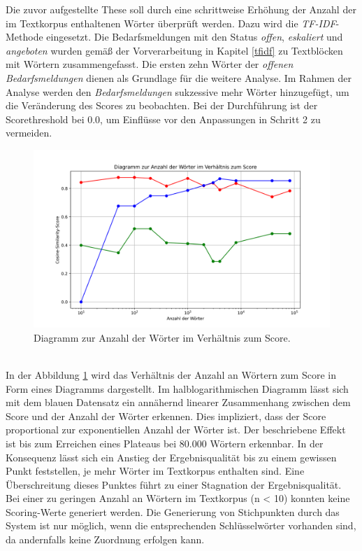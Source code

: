 Die zuvor aufgestellte These soll durch eine schrittweise Erhöhung der Anzahl der im Textkorpus enthaltenen Wörter überprüft werden. Dazu wird die \emph{TF-IDF}-Methode eingesetzt. Die Bedarfsmeldungen mit den Status \emph{offen}, \emph{eskaliert} und \emph{angeboten} wurden gemäß der Vorverarbeitung in Kapitel \ref{tfidf} zu Textblöcken mit Wörtern zusammengefasst. Die ersten zehn Wörter der \emph{offenen Bedarfsmeldungen} dienen als Grundlage für die weitere Analyse. Im Rahmen der Analyse werden den \emph{Bedarfsmeldungen} sukzessive mehr Wörter hinzugefügt, um die Veränderung des Scores zu beobachten. Bei der Durchführung ist der Scorethreshold bei 0.0, um Einflüsse vor den Anpassungen in Schritt 2 zu vermeiden.
\begin{figure}[H]
	\centering  
	\includegraphics[width=\linewidth]{plot/e1-woerter-score.png}
	\caption{Diagramm zur Anzahl der Wörter im Verhältnis zum Score.}
	\label{fig:woertervsscore}
\end{figure}\mbox{} \\
In der Abbildung \ref{fig:woertervsscore} wird das Verhältnis der Anzahl an Wörtern zum Score in Form eines Diagramms dargestellt. Im halblogarithmischen Diagramm lässt sich mit dem blauen Datensatz ein annähernd linearer Zusammenhang zwischen dem Score und der Anzahl der Wörter erkennen. Dies impliziert, dass der Score proportional zur exponentiellen Anzahl der Wörter ist. Der beschriebene Effekt ist bis zum Erreichen eines Plateaus bei 80.000 Wörtern erkennbar. In der Konsequenz lässt sich ein Anstieg der Ergebnisqualität bis zu einem gewissen Punkt feststellen, je mehr Wörter im Textkorpus enthalten sind. Eine Überschreitung dieses Punktes führt zu einer Stagnation der Ergebnisqualität. Bei einer zu geringen Anzahl an Wörtern im Textkorpus (n < 10) konnten keine Scoring-Werte generiert werden. Die Generierung von Stichpunkten durch das System ist nur möglich, wenn die entsprechenden Schlüsselwörter vorhanden sind, da andernfalls keine Zuordnung erfolgen kann.
